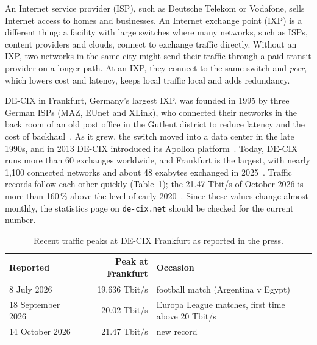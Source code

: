 An Internet service provider (ISP), such as Deutsche Telekom or Vodafone, sells Internet access to homes and businesses. An Internet exchange point (IXP) is a different thing: a facility with large switches where many networks, such as ISPs, content providers and clouds, connect to exchange traffic directly. Without an IXP, two networks in the same city might send their traffic through a paid transit provider on a longer path. At an IXP, they connect to the same switch and \emph{peer}, which lowers cost and latency, keeps local traffic local and adds redundancy.

\label{sec:decix}DE-CIX in Frankfurt, Germany's largest IXP, was founded in 1995 by three German ISPs (MAZ, EUnet and XLink), who connected their networks in the back room of an old post office in the Gutleut district to reduce latency and the cost of backhaul~\cite{decix_30years}. As it grew, the switch moved into a data center in the late 1990s, and in 2013 DE-CIX introduced its Apollon platform~\cite{wiki_decix}. Today, DE-CIX runs more than 60 exchanges worldwide, and Frankfurt is the largest, with nearly 1,100 connected networks and about 48 exabytes exchanged in 2025~\cite{hessenschau_decix,techeconomy_decix}. Traffic records follow each other quickly (Table~\ref{tab:decix}); the 21.47 Tbit/s of October 2026 is more than 160\,\% above the level of early 2020~\cite{itbrief_decix}. Since these values change almost monthly, the statistics page on \texttt{de-cix.net} should be checked for the current number.

\begin{table}[ht]
	\centering
	\small
	\begin{tabular}{@{}lrl@{}}
		\toprule
		Reported & Peak at Frankfurt & Occasion \\
		\midrule
		8 July 2026 & 19.636 Tbit/s & football match (Argentina v Egypt) \cite{atv_decix} \\
		18 September 2026 & 20.02 Tbit/s & Europa League matches, first time above 20 Tbit/s \cite{techeconomy_decix} \\
		14 October 2026 & 21.47 Tbit/s & new record~\cite{itbrief_decix} \\
		\bottomrule
	\end{tabular}
	\caption{Recent traffic peaks at DE-CIX Frankfurt as reported in the press.}
	\label{tab:decix}
\end{table}
